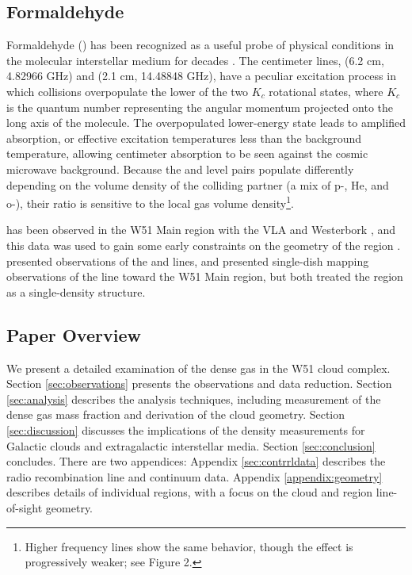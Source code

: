 \subsection{Formaldehyde}
Formaldehyde (\formaldehyde) has been recognized as a useful probe of physical
conditions in the molecular interstellar medium for decades
\citep{Mangum1993a}.  The centimeter lines, \formaldehyde \oneone (6.2 cm,
4.82966 GHz) and \twotwo (2.1 cm, 14.48848 GHz), have a peculiar excitation
process in which collisions overpopulate the lower of the two $K_c$ rotational
states, where $K_c$ is the quantum number representing the angular momentum
projected onto the long axis of the molecule.  
The overpopulated lower-energy state leads to amplified absorption, or
effective excitation temperatures less than the background temperature,
allowing \formaldehyde centimeter absorption to be seen against the cosmic
microwave background.
Because the \oneone and \twotwo
level pairs populate differently
depending on the volume density of the colliding partner (a mix of p-\hh, He,
and o-\hh), their ratio is sensitive to the local gas volume
density\footnote{Higher frequency
\formaldehyde lines show the same behavior, though the effect is progressively
weaker; see \citet{Darling2012b} Figure 2.}.

\formaldehyde \oneone has been observed in the W51 Main region with the VLA
\citep{Martin-Pintado1985a} and Westerbork \citep{Arnal1985a}, and this data
was used to gain some early constraints on the geometry of the region
\citep[e.g.][]{Carpenter1998a}.  \citet{Henkel1980a} presented observations of
the \oneone and \twotwo lines, and \citet{Martin-Pintado1985b} presented
single-dish mapping observations of the \formaldehyde \twotwo line toward the
W51 Main region, but both treated the region as a single-density structure.


\subsection{Paper Overview} 
We present a detailed examination of the dense gas in the W51 cloud complex.
Section \ref{sec:observations} presents the observations and data reduction.
Section \ref{sec:analysis} describes the analysis techniques, including
measurement of the dense gas mass fraction and derivation of the cloud
geometry.  Section \ref{sec:discussion} discusses the implications of the
density measurements for Galactic clouds and extragalactic interstellar media.
Section \ref{sec:conclusion} concludes.  There are two appendices: Appendix
\ref{sec:contrrldata} describes the radio recombination line and continuum
data.  Appendix \ref{appendix:geometry} describes details of individual
regions, with a focus on
the cloud and \hii region line-of-sight geometry.


